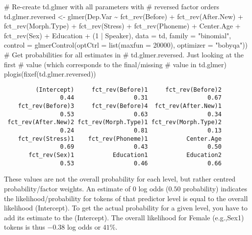 \documentclass[
  10pt,
  letterpaper]{article}
\newenvironment{Shaded}{\begin{snugshade}}{\end{snugshade}}
\newcommand{\AttributeTok}[1]{\textcolor[rgb]{0.40,0.45,0.13}{#1}}
\newcommand{\CommentTok}[1]{\textcolor[rgb]{0.37,0.37,0.37}{#1}}
\newcommand{\DecValTok}[1]{\textcolor[rgb]{0.68,0.00,0.00}{#1}}
\newcommand{\FunctionTok}[1]{\textcolor[rgb]{0.28,0.35,0.67}{#1}}
\newcommand{\NormalTok}[1]{\textcolor[rgb]{0.00,0.23,0.31}{#1}}
\newcommand{\OtherTok}[1]{\textcolor[rgb]{0.00,0.23,0.31}{#1}}
\newcommand{\SpecialCharTok}[1]{\textcolor[rgb]{0.37,0.37,0.37}{#1}}
\newcommand{\StringTok}[1]{\textcolor[rgb]{0.13,0.47,0.30}{#1}}
\renewcommand\texttt[1]{{\ttfamily\color{BrickRed}#1}}
\begin{document}
\begin{Shaded}
\begin{Highlighting}[]
\CommentTok{\# Re{-}create td.glmer with all parameters with}
\CommentTok{\# reversed factor orders}
\NormalTok{td.glmer.reversed }\OtherTok{\textless{}{-}} \FunctionTok{glmer}\NormalTok{(Dep.Var }\SpecialCharTok{\textasciitilde{}} \FunctionTok{fct\_rev}\NormalTok{(Before) }\SpecialCharTok{+}
    \FunctionTok{fct\_rev}\NormalTok{(After.New) }\SpecialCharTok{+} \FunctionTok{fct\_rev}\NormalTok{(Morph.Type) }\SpecialCharTok{+} \FunctionTok{fct\_rev}\NormalTok{(Stress) }\SpecialCharTok{+}
    \FunctionTok{fct\_rev}\NormalTok{(Phoneme) }\SpecialCharTok{+}\NormalTok{ Center.Age }\SpecialCharTok{+} \FunctionTok{fct\_rev}\NormalTok{(Sex) }\SpecialCharTok{+}
\NormalTok{    Education }\SpecialCharTok{+}\NormalTok{ (}\DecValTok{1} \SpecialCharTok{|}\NormalTok{ Speaker), }\AttributeTok{data =}\NormalTok{ td, }\AttributeTok{family =} \StringTok{"binomial"}\NormalTok{,}
    \AttributeTok{control =} \FunctionTok{glmerControl}\NormalTok{(}\AttributeTok{optCtrl =} \FunctionTok{list}\NormalTok{(}\AttributeTok{maxfun =} \DecValTok{20000}\NormalTok{),}
        \AttributeTok{optimizer =} \StringTok{"bobyqa"}\NormalTok{))}
\CommentTok{\# Get probabilities for all estimates in}
\CommentTok{\# td.glmer.reversed. Just looking at the first}
\CommentTok{\# value (which corresponds to the final/missing}
\CommentTok{\# value in td.glmer)}
\FunctionTok{plogis}\NormalTok{(}\FunctionTok{fixef}\NormalTok{(td.glmer.reversed))}
\end{Highlighting}
\end{Shaded}

\begin{verbatim}
         (Intercept)     fct_rev(Before)1     fct_rev(Before)2 
                0.44                 0.31                 0.67 
    fct_rev(Before)3     fct_rev(Before)4  fct_rev(After.New)1 
                0.53                 0.63                 0.34 
 fct_rev(After.New)2 fct_rev(Morph.Type)1 fct_rev(Morph.Type)2 
                0.24                 0.81                 0.13 
    fct_rev(Stress)1    fct_rev(Phoneme)1           Center.Age 
                0.69                 0.43                 0.50 
       fct_rev(Sex)1           Education1           Education2 
                0.53                 0.46                 0.66 
\end{verbatim}

These values are not the overall probability for each level, but rather
centred probability/factor weights. An estimate of \(0\) log odds
(\(0.50\) probability) indicates the likelihood/probability for tokens
of that predictor level is equal to the overall likelihood
\texttt{(Intercept)}. To get the actual probability for a given level,
you have to add its estimate to the \texttt{(Intercept)}. The overall
likelihood for \texttt{Female} (e.g.,\texttt{Sex1}) tokens is thus
\(-0.38\) log odds or \(41\%\).
\end{document}
